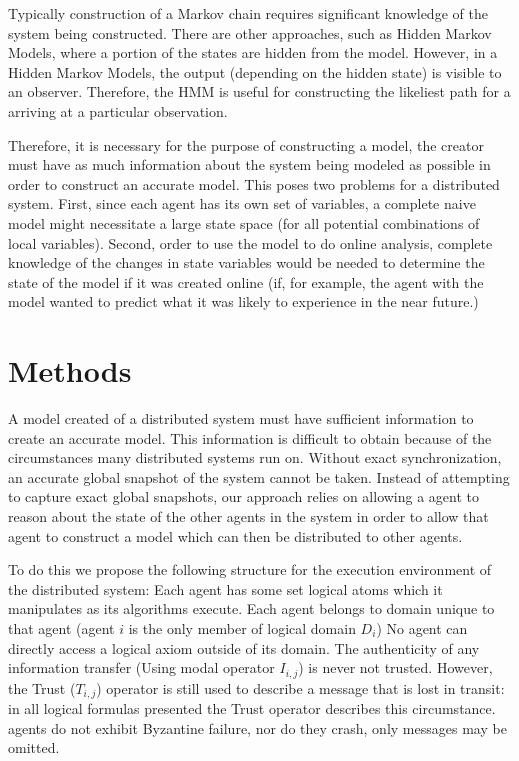 Typically construction of a Markov chain requires significant knowledge of the system being constructed. There are other approaches, such as Hidden Markov Models, where a portion of the states are hidden from the model. However, in a Hidden Markov Models, the output (depending on the hidden state) is visible to an observer. Therefore, the HMM is useful for constructing the likeliest path for a arriving at a particular observation.

Therefore, it is necessary for the purpose of constructing a model, the creator must have as much information about the system being modeled as possible in order to construct an accurate model. This poses two problems for a distributed system. First, since each agent has its own set of variables, a complete naive model might necessitate a large state space (for all potential combinations of local variables). Second, order to use the model to do online analysis, complete knowledge of the changes in state variables would be needed to determine the state of the model if it was created online (if, for example, the agent with the model wanted to predict what it was likely to experience in the near future.)


\section{Methods}

A model created of a distributed system must have sufficient information to create an accurate model. This information is difficult to obtain because of the circumstances many distributed systems run on. Without exact synchronization, an accurate global snapshot of the system cannot be taken. Instead of attempting to capture exact global snapshots, our approach relies on allowing a agent to reason about the state of the other agents in the system in order to allow that agent to construct a model which can then be distributed to other agents.

To do this we propose the following structure for the execution environment of the distributed system:
Each agent has some set logical atoms which it manipulates as its algorithms execute.
Each agent belongs to domain unique to that agent (agent $i$ is the only member of logical domain $D_i$)
No agent can directly access a logical axiom outside of its domain.
The authenticity of any information transfer (Using modal operator $I_{i,j}$) is never not trusted. However, the Trust ($T_{i,j}$) operator is still used to describe a message that is lost in transit: in all logical formulas presented the Trust operator describes this circumstance.
agents do not exhibit Byzantine failure, nor do they crash, only messages may be omitted.

